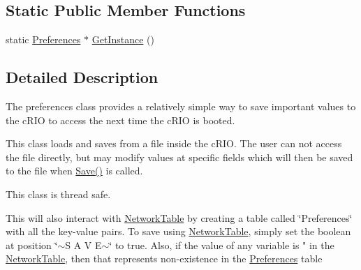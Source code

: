 \subsection*{Static Public Member Functions}
\begin{DoxyCompactItemize}
\item 
static \hyperlink{classPreferences}{Preferences} $\ast$ \hyperlink{classPreferences_aacc16e546a94d54772f3b500ec9a81a0}{GetInstance} ()
\end{DoxyCompactItemize}


\subsection{Detailed Description}
The preferences class provides a relatively simple way to save important values to the cRIO to access the next time the cRIO is booted.

This class loads and saves from a file inside the cRIO. The user can not access the file directly, but may modify values at specific fields which will then be saved to the file when \hyperlink{classPreferences_ae8ce1d8967e205e584e9cca1dbf86919}{Save()} is called.

This class is thread safe.

This will also interact with \hyperlink{}{NetworkTable} by creating a table called \char`\"{}Preferences\char`\"{} with all the key-\/value pairs. To save using \hyperlink{}{NetworkTable}, simply set the boolean at position \char`\"{}$\sim$S A V E$\sim$\char`\"{} to true. Also, if the value of any variable is " in the \hyperlink{}{NetworkTable}, then that represents non-\/existence in the \hyperlink{classPreferences}{Preferences} table 

